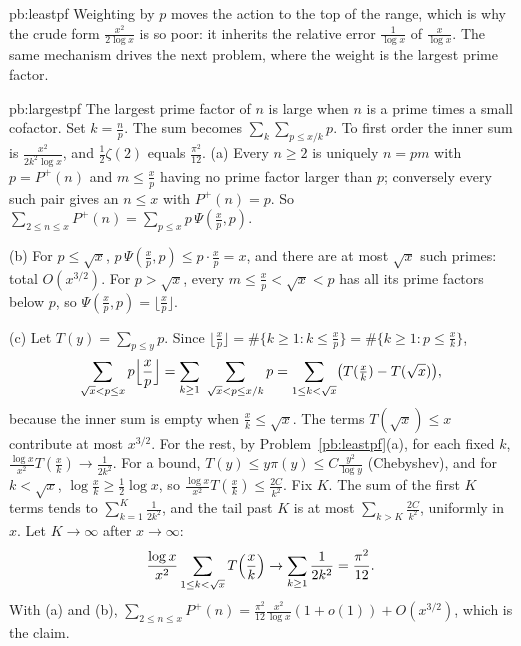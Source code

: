 \begin{solution}{pb:leastpf}
\leads Weighting by $p$ moves the action to the top of the range, which is why the crude form $\frac{x^2}{2\log x}$ is so poor: it inherits the relative error $\frac1{\log x}$
of $\frac x{\log x}$. The same mechanism drives the next problem, where the weight is the largest prime factor.
\end{solution}

\begin{solution}{pb:largestpf}
\idea The largest prime factor of $n$ is large when $n$ is a prime times a small cofactor. Set $k=\frac np$. The sum becomes $\sum_k\sum_{p\le x/k}p$. To first order the inner sum is $\frac{x^2}{2k^2\log x}$, and $\frac12\zeta(2)$ equals $\frac{\pi^2}{12}$.
\writeup (a) Every $n\ge2$ is uniquely $n=pm$ with $p=P^+(n)$ and $m\le\frac xp$ having no prime factor larger than $p$; conversely every such pair gives an $n\le x$ with $P^+(n)=p$.
So $\sum_{2\le n\le x}P^+(n)=\sum_{p\le x}p\,\Psi(\frac xp,p)$.

(b) For $p\le\sqrt x$, $p\,\Psi(\frac xp,p)\le p\cdot\frac xp=x$, and there are at most $\sqrt x$ such primes: total $O(x^{3/2})$. For $p>\sqrt x$, every $m\le\frac xp<\sqrt x<p$
has all its prime factors below $p$, so $\Psi(\frac xp,p)=\lfloor\frac xp\rfloor$.

(c) Let $T(y)=\sum_{p\le y}p$. Since $\lfloor\frac xp\rfloor=\#\{k\ge1:k\le\frac xp\}=\#\{k\ge1:p\le\frac xk\}$,
\[
\sum_{\sqrt x<p\le x}p\Bigl\lfloor\frac xp\Bigr\rfloor=\sum_{k\ge1}\ \sum_{\sqrt x<p\le x/k}p=\sum_{1\le k<\sqrt x}\bigl(T(\tfrac xk)-T(\sqrt x)\bigr),
\]
because the inner sum is empty when $\frac xk\le\sqrt x$. The terms $T(\sqrt x)\le x$ contribute at most $x^{3/2}$. For the rest, by Problem~\ref{pb:leastpf}(a), for each fixed $k$,
$\frac{\log x}{x^2}T(\frac xk)\to\frac1{2k^2}$. For a bound, $T(y)\le y\pi(y)\le C\frac{y^2}{\log y}$ (Chebyshev), and for $k<\sqrt x$, $\log\frac xk\ge\frac12\log x$, so
$\frac{\log x}{x^2}T(\frac xk)\le\frac{2C}{k^2}$. Fix $K$. The sum of the first $K$ terms tends to $\sum_{k=1}^K\frac1{2k^2}$, and the tail past $K$ is at most $\sum_{k>K}\frac{2C}{k^2}$, uniformly in $x$. Let $K\to\infty$ after $x\to\infty$:
\[
\frac{\log x}{x^2}\sum_{1\le k<\sqrt x}T\Bigl(\frac xk\Bigr)\to\sum_{k\ge1}\frac1{2k^2}=\frac{\pi^2}{12}.
\]
With (a) and (b), $\sum_{2\le n\le x}P^+(n)=\frac{\pi^2}{12}\frac{x^2}{\log x}(1+o(1))+O(x^{3/2})$, which is the claim.


\end{solution}
